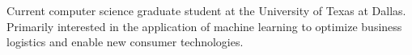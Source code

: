 

\begin{cvparagraph}

Current computer science graduate student at the University of Texas
at Dallas. Primarily interested in the application of machine learning
to optimize business logistics and enable new consumer technologies.
\end{cvparagraph}
